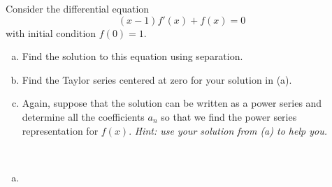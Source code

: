 \documentclass[12pt]{article} %
\begin{document}
\newpage
\begin{problem}
Consider the differential equation
\[
(x-1)f'(x) + f(x)=0
\]
with initial condition $f(0)=1$.
\begin{enumerate}[(a)]
    \item Find the solution to this equation using separation.
    \item Find the Taylor series centered at zero for your solution in (a).
    \item Again, suppose that the solution can be written as a power series and determine all the coefficients $a_n$ so that we find the power series representation for $f(x)$. \emph{Hint: use your solution from (a) to help you.}
\end{enumerate}
\end{problem}
\begin{solution}~
\begin{enumerate}[(a)]
    \item 
\end{enumerate}
\end{solution}
\end{document}
